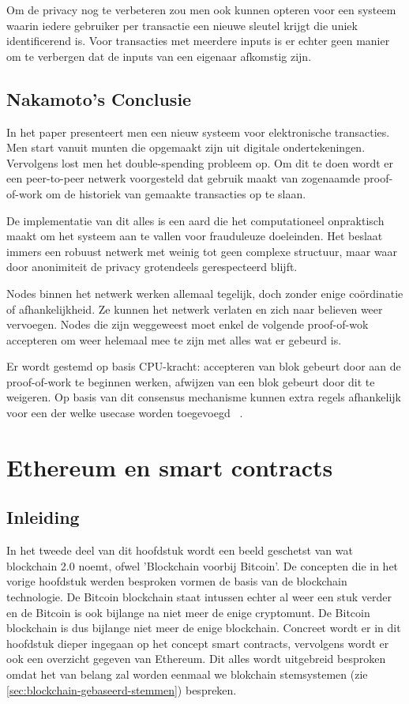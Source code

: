 	Om de privacy nog te verbeteren zou men ook kunnen opteren voor een systeem waarin iedere gebruiker per transactie een nieuwe sleutel krijgt die uniek identificerend is. Voor transacties met meerdere inputs is er echter geen manier om te verbergen dat de inputs van een eigenaar afkomstig zijn.
	\subsection{Nakamoto’s Conclusie}
	In het paper presenteert men een nieuw systeem voor elektronische transacties. Men start vanuit munten die opgemaakt zijn uit digitale ondertekeningen. Vervolgens lost men het double-spending probleem op. Om dit te doen wordt er een peer-to-peer netwerk voorgesteld dat gebruik maakt van zogenaamde proof-of-work om de historiek van gemaakte transacties op te slaan. 
	
	De implementatie van dit alles is een aard die het computationeel onpraktisch maakt om het systeem aan te vallen voor frauduleuze doeleinden. Het beslaat immers een robuust netwerk met weinig tot geen complexe structuur, maar waar door anonimiteit de privacy grotendeels gerespecteerd blijft. 
	
	Nodes binnen het netwerk werken allemaal tegelijk, doch zonder enige coördinatie of afhankelijkheid. Ze kunnen het netwerk verlaten en zich naar believen weer vervoegen. Nodes die zijn weggeweest moet enkel de volgende proof-of-wok accepteren om weer helemaal mee te zijn met alles wat er gebeurd is. 
	
	Er wordt gestemd op basis CPU-kracht: accepteren van blok gebeurt door aan de proof-of-work te beginnen werken, afwijzen van een blok gebeurt door dit te weigeren. Op basis van dit consensus mechanisme kunnen extra regels afhankelijk voor een der welke usecase worden toegevoegd ~\autocite{Nakamoto2008}. 
	\newpage
\section{Ethereum en smart contracts}
\label{sec:ethereum-en-smart-contracts}
	\subsection*{Inleiding}
		In het tweede deel van dit hoofdstuk wordt een beeld geschetst van wat \textcite{Swan2015} blockchain 2.0 noemt, ofwel 'Blockchain voorbij Bitcoin'. De concepten die in het vorige hoofdstuk werden besproken vormen de basis van de blockchain technologie. De Bitcoin blockchain staat intussen echter al weer een stuk verder en de Bitcoin is ook bijlange na niet meer de enige cryptomunt. De Bitcoin blockchain is dus bijlange niet meer de enige blockchain. Concreet wordt er in dit hoofdstuk dieper ingegaan op het concept  smart contracts, vervolgens wordt er ook een overzicht gegeven van Ethereum. Dit alles wordt uitgebreid besproken omdat het van belang zal worden eenmaal we blokchain stemsystemen (zie \ref{sec:blockchain-gebaseerd-stemmen}) bespreken.

